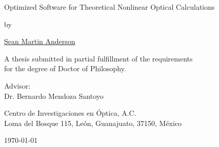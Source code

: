 \begin{titlingpage*}

\let\cleardoublepage\clearpage

\begin{center}

\vspace*{2cm}

{\Huge Optimized Software for Theoretical Nonlinear Optical Calculations}
\vspace{1.0cm}

{\large by}
\vspace{1.0cm}

{\LARGE \href{mailto:sean.martin.anderson@gmail.com}{Sean Martin Anderson}}
\vspace{3cm}

{\Large A thesis submitted in partial fulfillment of the requirements\\
\vspace{0.25cm}
for the degree of Doctor of Philosophy.}
\vspace{4cm}

{\large Advisor:\\
Dr. Bernardo Mendoza Santoyo
\vspace*{1cm}

Centro de Investigaciones en \'Optica, A.C.\\
Loma del Bosque 115, Le\'on, Guanajuato, 37150, M\'exico}

\vfill

\today

\end{center}

\end{titlingpage*}
